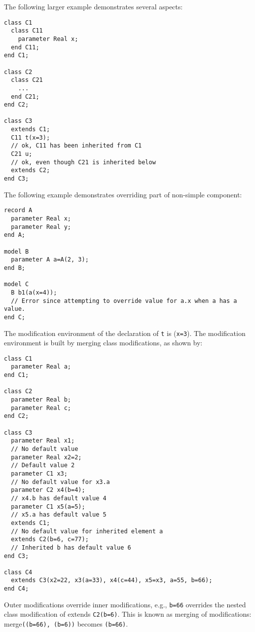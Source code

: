 \begin{example}
The following larger example demonstrates several aspects:
\begin{lstlisting}[language=modelica]
class C1
  class C11
    parameter Real x;
  end C11;
end C1;

class C2
  class C21
    ...
  end C21;
end C2;

class C3
  extends C1;
  C11 t(x=3);
  // ok, C11 has been inherited from C1
  C21 u;
  // ok, even though C21 is inherited below
  extends C2;
end C3;
\end{lstlisting}
The following example demonstrates overriding part of non-simple component:
\begin{lstlisting}[language=modelica]
record A
  parameter Real x;
  parameter Real y;
end A;

model B
  parameter A a=A(2, 3);
end B;

model C
  B b1(a(x=4));
  // Error since attempting to override value for a.x when a has a value.
end C;
\end{lstlisting}

The modification environment of the declaration of \lstinline!t! is
(\lstinline!x=3!). The modification environment is built by merging class modifications, as shown by:
\begin{lstlisting}[language=modelica]
class C1
  parameter Real a;
end C1;

class C2
  parameter Real b;
  parameter Real c;
end C2;

class C3
  parameter Real x1;
  // No default value
  parameter Real x2=2;
  // Default value 2
  parameter C1 x3;
  // No default value for x3.a
  parameter C2 x4(b=4);
  // x4.b has default value 4
  parameter C1 x5(a=5);
  // x5.a has default value 5
  extends C1;
  // No default value for inherited element a
  extends C2(b=6, c=77);
  // Inherited b has default value 6
end C3;

class C4
  extends C3(x2=22, x3(a=33), x4(c=44), x5=x3, a=55, b=66);
end C4;
\end{lstlisting}

Outer modifications override inner modifications, e.g., \lstinline!b=66!
overrides the nested class modification of extends \lstinline!C2(b=6)!.
This is known as merging of modifications: merge\lstinline!((b=66), (b=6))!
becomes \lstinline!(b=66)!.


\end{example}
